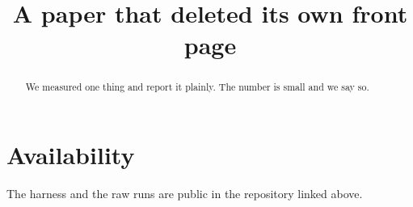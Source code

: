 \documentclass[sigconf,review,anonymous]{acmart}
\begin{document}
\title{A paper that deleted its own front page}

\begin{abstract}
We measured one thing and report it plainly. The number is small and we say so.
\end{abstract}

\section{Availability}
The harness and the raw runs are public in the repository linked above.
\end{document}
